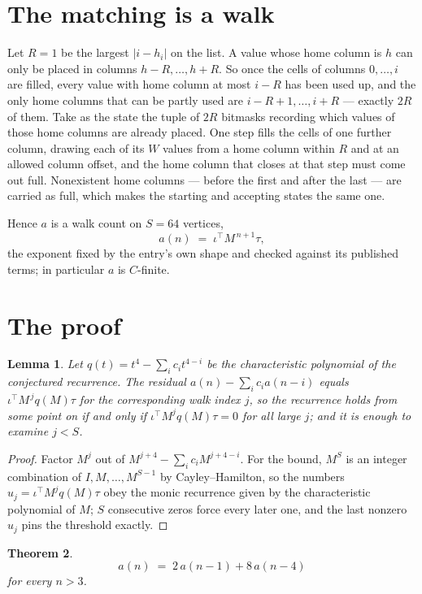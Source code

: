 \documentclass[11pt,a4paper]{article}
\theoremstyle{plain}
\newtheorem{theorem}{Theorem}
\newtheorem{lemma}[theorem]{Lemma}
\theoremstyle{definition}
\begin{document}
\section{The matching is a walk}

Let $R=1$ be the largest $|i-h_i|$ on the list. A value whose home column is $h$ can only be
placed in columns $h-R,\dots,h+R$. So once the cells of columns $0,\dots,i$ are filled, every
value with home column at most $i-R$ has been used up, and the only home columns that can be
partly used are $i-R+1,\dots,i+R$ --- exactly $2R$ of them. Take as the state the tuple of
$2R$ bitmasks recording which values of those home columns are already placed. One step fills
the cells of one further column, drawing each of its $W$ values from a home column within $R$
and at an allowed column offset, and the home column that closes at that step must come out
full. Nonexistent home columns --- before the first and after the last --- are carried as
full, which makes the starting and accepting states the same one.

Hence $a$ is a walk count on $S=64$ vertices,
\[
a(n)\;=\;\iota^{\!\top}M^{\,n+1}\tau ,
\]
the exponent fixed by the entry's own shape and checked against its published terms; in
particular $a$ is $C$-finite.

\section{The proof}

\begin{lemma}\label{lem:crit}
Let $q(t)=t^{4}-\sum_i c_it^{4-i}$ be the characteristic polynomial of the
conjectured recurrence. The residual $a(n)-\sum_ic_ia(n-i)$ equals
$\iota^{\!\top}M^{\,j}q(M)\tau$ for the corresponding walk index $j$, so the recurrence
holds from some point on if and only if $\iota^{\!\top}M^{j}q(M)\tau=0$ for all large $j$;
and it is enough to examine $j<S$.
\end{lemma}

\begin{proof}
Factor $M^{j}$ out of $M^{j+4}-\sum_ic_iM^{j+4-i}$. For the bound, $M^{S}$
is an integer combination of $I,M,\dots,M^{S-1}$ by Cayley--Hamilton, so the numbers
$u_j=\iota^{\!\top}M^{j}q(M)\tau$ obey the monic recurrence given by the characteristic
polynomial of $M$; $S$ consecutive zeros force every later one, and the last nonzero $u_j$
pins the threshold exactly.
\end{proof}

\begin{theorem}
\[
a(n)\;=\;2\,a(n-1) + 8\,a(n-4)
\]
for every $n>3$.
\end{theorem}
\end{document}

